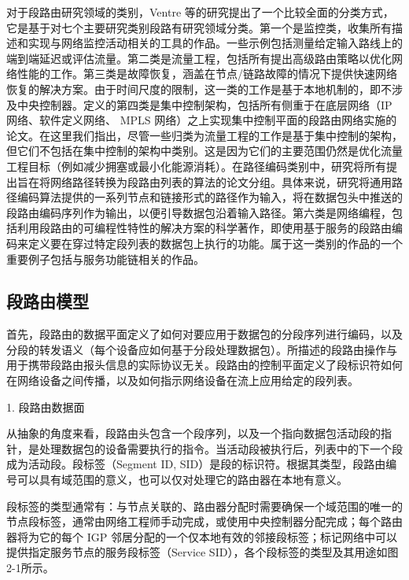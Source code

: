 对于段路由研究领域的类别，Ventre \cite{SRSURVEYS} 等的研究提出了一个比较全面的分类方式，它是基于对七个主要研究类别段路有研究领域分类。第一个是监控类，收集所有描述和实现与网络监控活动相关的工具的作品。一些示例包括测量给定输入路线上的端到端延迟或评估流量。第二类是流量工程，包括所有提出高级路由策略以优化网络性能的工作。第三类是故障恢复，涵盖在节点/链路故障的情况下提供快速网络恢复的解决方案。由于时间尺度的限制，这一类的工作是基于本地机制的，即不涉及中央控制器。定义的第四类是集中控制架构，包括所有侧重于在底层网络（IP网络、软件定义网络、 \gls*{MPLS} 网络）之上实现集中控制平面的段路由网络实施的论文。在这里我们指出，尽管一些归类为流量工程的工作是基于集中控制的架构，但它们不包括在集中控制的架构中类别。这是因为它们的主要范围仍然是优化流量工程目标（例如减少拥塞或最小化能源消耗）。在路径编码类别中，研究将所有提出旨在将网络路径转换为段路由列表的算法的论文分组。具体来说，研究将通用路径编码算法提供的一系列节点和链接形式的路径作为输入，将在数据包头中推送的段路由编码序列作为输出，以便引导数据包沿着输入路径。第六类是网络编程，包括利用段路由的可编程性特性的解决方案的科学著作，即使用基于服务的段路由编码来定义要在穿过特定段列表的数据包上执行的功能。属于这一类别的作品的一个重要例子包括与服务功能链相关的作品。

\subsection{段路由模型}

首先，段路由的数据平面定义了如何对要应用于数据包的分段序列进行编码，以及分段的转发语义（每个设备应如何基于分段处理数据包）。所描述的段路由操作与用于携带段路由报头信息的实际协议无关。段路由的控制平面定义了段标识符如何在网络设备之间传播，以及如何指示网络设备在流上应用给定的段列表。

1. 段路由数据面

从抽象的角度来看，段路由头包含一个段序列，以及一个指向数据包活动段的指针，是处理数据包的设备需要执行的指令。当活动段被执行后，列表中的下一个段成为活动段。段标签（Segment ID, SID）是段的标识符。根据其类型，段路由编号可以具有域范围的意义，也可以仅对处理它的路由器在本地有意义。

段标签的类型通常有：与节点关联的、路由器分配时需要确保一个域范围的唯一的节点段标签，通常由网络工程师手动完成，或使用中央控制器分配完成；每个路由器将为它的每个 \gls*{IGP} 邻居分配的一个仅本地有效的邻接段标签；标记网络中可以提供指定服务节点的服务段标签（Service SID），各个段标签的类型及其用途如图2-1所示。

